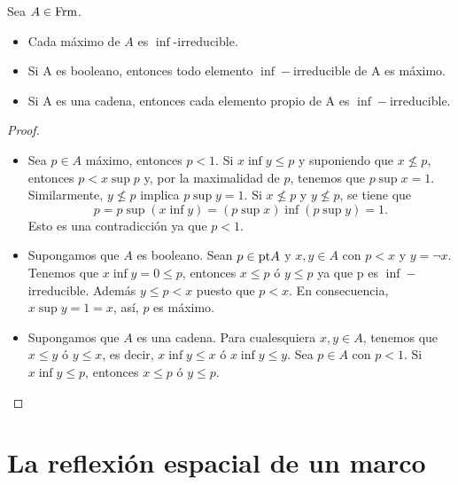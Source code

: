\begin{lemma}
  Sea $A\in \mathrm{Frm}$.
  \begin{itemize}
      \item Cada máximo de $A$ es $\inf$-irreducible.
      \item Si A es booleano, entonces todo elemento $\inf-$irreducible de A es máximo.
      \item Si A es una cadena, entonces cada elemento propio de A es $\inf-$irreducible.
  \end{itemize}
\end{lemma}
\begin{proof}\quad
  \begin{itemize}
      \item Sea $p\in A$ máximo, entonces $p<1$. Si $x\inf y\leq p$ y suponiendo que $x\not\leq p$, entonces $p<x\sup p$ y, por la maximalidad de $p$, tenemos que $p\sup x=1$. Similarmente, $y\not\leq p$ implica $p\sup y=1$. Si $x\not\leq p$ y $y\not\leq p$, se tiene que 
      \[p=p\sup (x\inf y)=(p\sup x)\inf(p\sup y)=1.\]
      Esto es una contradicción ya que $p<1$.
      \item Supongamos que $A$ es booleano. Sean $p\in\mathrm{pt} A$ y $x,y\in A$ con $p<x$ y $y=\neg x$. Tenemos que $x\inf y=0\leq p$, entonces $x\leq p$ ó $y\leq p$ ya que p es $\inf-$irreducible. Además $y\leq p<x$ puesto que $p<x$. En consecuencia, $x\sup y=1=x$, así, $p$ es máximo.
      \item Supongamos que $A$ es una cadena. Para cualesquiera $x,y\in A$, tenemos que $x\leq y$ ó $y\leq x$, es decir, $x\inf y\leq x$ ó $x\inf y\leq y$. Sea $p\in A$ con $p<1$. Si $x\inf y\leq p$, entonces $x\leq p$ ó $y\leq p$.
  \end{itemize}
\end{proof}

\section{La reflexión espacial de un marco}

